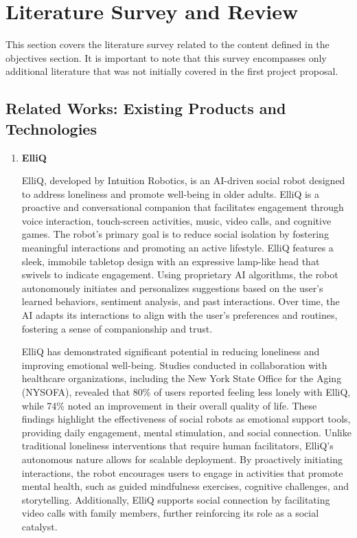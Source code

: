 \section{Literature Survey and Review}
This section covers the literature survey related to the content defined in the objectives section. It is important to note that this survey encompasses only additional literature that was not initially covered in the first project proposal.

\subsection{Related Works: Existing Products and Technologies}

\begin{enumerate}
    \item{\bf{ElliQ}}
    \vspace{0.25cm}


ElliQ, developed by Intuition Robotics, is an AI-driven social robot designed to address loneliness and promote well-being in older adults. ElliQ is a proactive and conversational companion that facilitates engagement through voice interaction, touch-screen activities, music, video calls, and cognitive games. The robot's primary goal is to reduce social isolation by fostering meaningful interactions and promoting an active lifestyle. ElliQ features a sleek, immobile tabletop design with an expressive lamp-like head that swivels to indicate engagement. Using proprietary AI algorithms, the robot autonomously initiates and personalizes suggestions based on the user’s learned behaviors, sentiment analysis, and past interactions. Over time, the AI adapts its interactions to align with the user’s preferences and routines, fostering a sense of companionship and trust.

ElliQ has demonstrated significant potential in reducing loneliness and improving emotional well-being. Studies conducted in collaboration with healthcare organizations, including the New York State Office for the Aging (NYSOFA), revealed that 80\% of users reported feeling less lonely with ElliQ, while 74\% noted an improvement in their overall quality of life. These findings highlight the effectiveness of social robots as emotional support tools, providing daily engagement, mental stimulation, and social connection. Unlike traditional loneliness interventions that require human facilitators, ElliQ's autonomous nature allows for scalable deployment. By proactively initiating interactions, the robot encourages users to engage in activities that promote mental health, such as guided mindfulness exercises, cognitive challenges, and storytelling. Additionally, ElliQ supports social connection by facilitating video calls with family members, further reinforcing its role as a social catalyst.


\end{enumerate}
